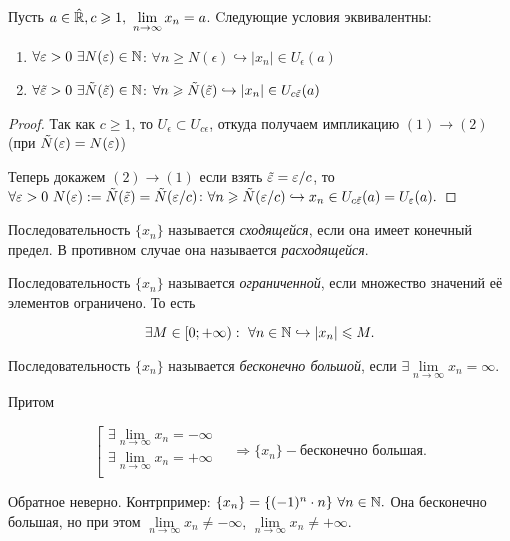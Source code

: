 \begin{proposition}
    Пусть $a \in \Hat{\R}, c \geq 1, \   \lim\limits_{n\to \infty} x_{n} = a$. Cледующие условия эквивалентны:
    \begin{enumerate}
        \item $\forall \epsilon > 0 \  \exists N(\epsilon) \in \N$: $\forall n \geq N(\epsilon) \hookrightarrow |x_{n}| \in U_{\epsilon}(a)$
        \item $\forall \Tilde{\epsilon} > 0 \  \exists \Tilde{N}(\Tilde{\epsilon}) \in \N$: $\forall n \geq \Tilde{N}(\Tilde{\epsilon}) \hookrightarrow |x_{n}| \in U_{c\Tilde{\epsilon}}(a)$
    \end{enumerate}
\end{proposition}
\newpage
\begin{proof}
    Так как $c \geq 1$, то $U_{\epsilon} \subset U_{c\epsilon}$, откуда получаем импликацию $(1)\to (2)$ (при $\Tilde{N} (\epsilon) = N(\epsilon)$)

    Теперь докажем $(2)\to (1)$ если взять $\Tilde{\epsilon} = \epsilon / c$, то $\forall \epsilon > 0 \  N(\epsilon) := \Tilde{N}(\Tilde{\epsilon}) = \Tilde{N}(\epsilon / c)$: $\forall n \geq \Tilde{N}(\epsilon / c) \hookrightarrow x_{n} \in U_{c\Tilde{\epsilon}} (a) = U_{\epsilon} (a).$
\end{proof}
\begin{definition}
    Последовательность $\{ x_{n} \}$ называется \textit{сходящейся}, если она имеет конечный предел. В противном случае она называется \textit{расходящейся}.
\end{definition}
\begin{definition}
    Последовательность $\{ x_{n} \}$ называется \textit{ограниченной}, если множество значений её элементов ограничено. То есть

    $$ \exists M \in [0; +\infty): \  \forall n \in \N \hookrightarrow |x_{n}| \leq M.$$
\end{definition}
\begin{definition}
    Последовательность $\{ x_{n} \}$ называется \textit{бесконечно большой}, если \newline $\exists \lim\limits_{n\to \infty} x_{n} = \infty.$
\end{definition}
\begin{note}
    Притом

    $$\left[ 
      \begin{gathered} 
        \exists \lim\limits_{n\to \infty} x_{n} = -\infty \\ 
        \exists \lim\limits_{n\to \infty} x_{n} = +\infty \\ 
      \end{gathered}
      \quad \Rightarrow \{ x_{n} \} - \textit{бесконечно большая.}
\right.$$

    Обратное неверно. Контрпример: $\{ x_{n} \} = \{ (-1)^{n} \cdot n \} \  \forall n \in \N.$ Она бесконечно большая, но при этом $\lim\limits_{n\to \infty} x_{n} \neq -\infty$, $\lim\limits_{n\to \infty} x_{n} \neq +\infty.$
\end{note}
